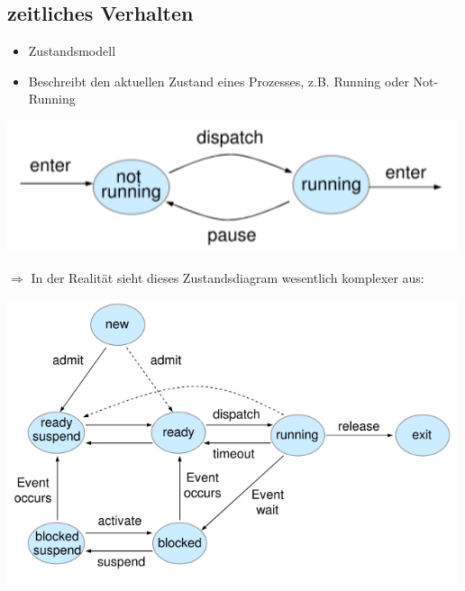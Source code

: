 \documentclass{report}
\newenvironment{Figure}
	{\par\medskip\noindent\minipage{\linewidth}}
	{\endminipage\par\medskip}
\theoremstyle{definition}
\theoremstyle{example}
\begin{document}
	\subsection{zeitliches Verhalten}
\begin{itemize}
	\item Zustandsmodell
	\item Beschreibt den aktuellen Zustand eines Prozesses, z.B. Running oder Not-Running
\end{itemize}

\begin{Figure}
\centering
\includegraphics[width=500px]{img/ProzessausfuehrungZeitlich.png}
	\label{fig:Prozessausführung einer CPU zeitliches Verhalten}
\end{Figure}

$\Rightarrow$ In der Realität sieht dieses Zustandsdiagram wesentlich komplexer aus:\\
\begin{Figure}
\centering
\includegraphics[width=500px]{img/ProzessausfuehrungZeitlichReal.png}
	\label{fig:Prozessausführung einer CPU zeitliches Verhalten (Realität)}
\end{Figure}
\end{document}
